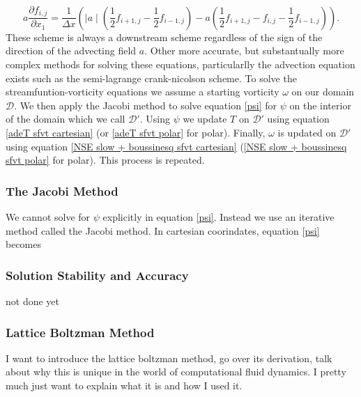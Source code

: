 \documentclass{article}
\begin{document}
\begin{equation}
	a \frac{\partial f_{i,j}}{\partial x_1} = \frac{1}{\Delta x} ( \mid a\mid (  \frac{1}{2} f_{i+1,j} - \frac{1}{2} f_{i-1,j}   ) - a ( \frac{1}{2} f_{i+1,j} -f_{i,j} - \frac{1}{2} f_{i-1,j} )).
\end{equation}
These scheme is always a downstream scheme regardless of the sign of the direction of the advecting field $a$.
\newline
Other more accurate, but substantually more complex methods for solving these equations, particularlly the advection equation exists such as the semi-lagrange crank-nicolson scheme.
\newline
To solve the streamfuntion-vorticity equations we assume a starting vorticity $\omega$ on our domain $\mathcal{D}$. We then apply the Jacobi method to solve equation \ref{psi} for $\psi$ on the interior of the domain which we call $\mathcal{D}'$. 
Using $\psi$ we update $T$ on $\mathcal{D}'$ using equation \ref{adeT sfvt cartesian} (or \ref{adeT sfvt polar} for polar). Finally, $\omega$ is updated on $\mathcal{D}'$ using 
equation \ref{NSE slow + boussinesq sfvt cartesian} (\ref{NSE slow + boussinesq sfvt polar} for polar). This process is repeated.

\subsubsection*{The Jacobi Method}
We cannot solve for $\psi$ explicitly in equation \ref{psi}. Instead we use an iterative method called the Jacobi method. In cartesian coorindates, equation \ref{psi} becomes


\subsubsection*{Solution Stability and Accuracy}
not done yet














\subsubsection*{Lattice Boltzman Method}
I want to introduce the lattice boltzman method, go over its derivation, talk about why this is unique 
in the world of computational fluid dynamics. I pretty much just want to explain what it is and how I used it.
\newline
\end{document}
